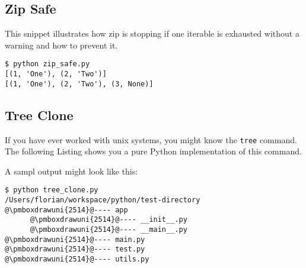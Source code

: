 \subsection{Zip Safe}

This snippet illustrates how zip is stopping if one iterable is exhausted without a warning and how to prevent it.



\begin{lstlisting}[caption=Output of zip\_safe.py]
$ python zip_safe.py
[(1, 'One'), (2, 'Two')]
[(1, 'One'), (2, 'Two'), (3, None)]
\end{lstlisting}


\subsection{Tree Clone}

If you have ever worked with unix systems, you might know the \lstinline{tree} command.
The following Listing shows you a pure Python implementation of this command.



A sampl output might look like this:

\begin{lstlisting}[caption=Output of tree\_clone.py,escapechar=@]
$ python tree_clone.py
/Users/florian/workspace/python/test-directory
@\pmboxdrawuni{2514}@---- app
      @\pmboxdrawuni{2514}@---- __init__.py
      @\pmboxdrawuni{2514}@---- __main__.py
@\pmboxdrawuni{2514}@---- main.py
@\pmboxdrawuni{2514}@---- test.py
@\pmboxdrawuni{2514}@---- utils.py
\end{lstlisting}
